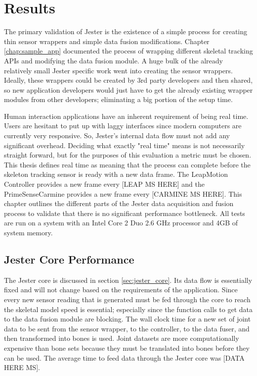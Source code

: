 \chapter{Results}

The primary validation of Jester is the existence of a simple process for creating thin sensor wrappers and simple data fusion modifications. Chapter \ref{chap:sample_app} documented the process of wrapping different skeletal tracking APIs and modifying the data fusion module. A huge bulk of the already relatively small Jester specific work went into creating the sensor wrappers. Ideally, these wrappers could be created by 3rd party developers and then shared, so new application developers would just have to get the already existing wrapper modules from other developers; eliminating a big portion of the setup time.

Human interaction applications have an inherent requirement of being real time. Users are hesitant to put up with laggy interfaces since modern computers are currently very responsive. So, Jester's internal data flow must not add any significant overhead. Deciding what exactly "real time" means is not necessarily straight forward, but for the purposes of this evaluation a metric must be chosen. This thesis defines real time as meaning that the process can complete before the skeleton tracking sensor is ready with a new data frame. The LeapMotion Controller provides a new frame every [LEAP MS HERE] and the PrimeSenseCarmine provides a new frame every [CARMINE MS HERE]. This chapter outlines the different parts of the Jester data acquisition and fusion process to validate that there is no significant performance bottleneck. All tests are run on a system with an Intel Core 2 Duo 2.6 GHz processor and 4GB of system memory.

\section{Jester Core Performance}

The Jester core is discussed in section \ref{sec:jester_core}. Its data flow is essentially fixed and will not change based on the requirements of the application. Since every new sensor reading that is generated must be fed through the core to reach the skeletal model speed is essential; especially since the function calls to get data to the data fusion module are blocking. The wall clock time for a new set of joint data to be sent from the sensor wrapper, to the controller, to the data fuser, and then transformed into bones is used. Joint datasets are more computationally expensive than bone sets because they must be translated into bones before they can be used. The average time to feed data through the Jester core was [DATA HERE MS].

